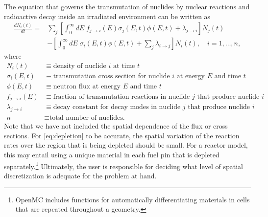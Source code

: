 \documentclass[3p,authoryear]{elsarticle}
\begin{document}
The equation that governs the transmutation of nuclides by nuclear reactions and
radioactive decay inside an irradiated environment can be written as
\begin{equation}
  \label{eq:depletion}
  \begin{split}
  \frac{dN_i(t)}{dt} = &\sum\limits_j \left [ \int_0^\infty dE \;
  f_{j \rightarrow i}(E) \sigma_j (E, t) \phi(E,t) + \lambda_{j\rightarrow i}
  \right ] N_j(t) \\ &- \left [\int_0^\infty dE \; \sigma_i (E,t) \phi(E,t) +
  \sum\limits_j \lambda_{i\rightarrow j} \right ] N_i(t), \quad i=1,\dots,n ,
  \end{split}
\end{equation}
where
\begin{equation*}
  \begin{split}
  N_i(t) &\equiv \text{density of nuclide $i$ at time $t$} \\
  \sigma_i(E,t) &\equiv \text{transmutation cross section for nuclide $i$ at energy $E$ and time $t$} \\
  \phi(E,t) &\equiv \text{neutron flux at energy $E$ and time $t$} \\
  f_{j \rightarrow i}(E) &\equiv \text{fraction of transmutation reactions in nuclide $j$ that produce nuclide $i$} \\
  \lambda_{j \rightarrow i} &\equiv \text{decay constant for decay modes in nuclide $j$ that produce nuclide $i$} \\
  n &\equiv \text{total number of nuclides.}
  \end{split}
\end{equation*}
Note that we have not included the spatial dependence of the flux or cross
sections. For \cref{eq:depletion} to be accurate, the spatial variation of the
reaction rates over the region that is being depleted should be small. For a
reactor model, this may entail using a unique material in each fuel pin that is
depleted separately.\footnote{OpenMC includes functions for automatically
differentiating materials in cells that are repeated throughout a geometry.}
Ultimately, the user is responsible for deciding what level of spatial
discretization is adequate for the problem at hand.
\end{document}
